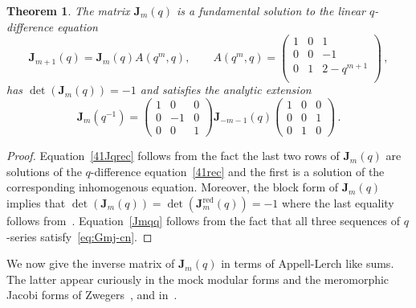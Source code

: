 \documentclass[12pt,reqno]{amsart}
\newtheorem{theorem}{Theorem}
\theoremstyle{definition}
\def\be{\begin{equation}}
\def\ee{\end{equation}}
\def\bJ{\mathbf J}
\def\RED{\mathrm{red}}
\begin{document}
\begin{theorem}
\label{thm.41bJ1}
  The matrix $\bJ_{m}(q)$ is a fundamental solution to the linear $q$-difference
  equation
\be
\label{41Jqrec}
\bJ_{m+1}(q) = \bJ_{m}(q) A(q^m,q), \qquad A(q^m,q)=
\begin{pmatrix}
1 & 0 & 1\\
0 & 0 & -1\\
0 & 1 & 2-q^{m+1}\\
\end{pmatrix} \,,
\ee
has $\det(\bJ_m(q))=-1$ and satisfies the analytic extension
\begin{equation}
\label{Jmqq}  
  \bJ_m(q^{-1}) =
  \begin{pmatrix}
    1&0&0\\
    0&-1&0\\
    0&0&1
  \end{pmatrix} \bJ_{-m-1}(q)
  \begin{pmatrix}
    1&0&0\\
    0&0&1\\
    0&1&0
  \end{pmatrix} \,.
\end{equation}
\end{theorem}


\begin{proof}
Equation~\eqref{41Jqrec} follows from the fact the last two rows of $\bJ_m(q)$ are   
solutions of the $q$-difference equation~\eqref{41rec} and the first is a solution
of the corresponding inhomogenous equation. Moreover, the block form of $\bJ_m(q)$
implies that $\det(\bJ_m(q))=\det(\bJ^\RED_m(q))=-1$ where the last equality follows
from~\cite[eq.~(14)]{GGM:resurgent}. Equation~\eqref{Jmqq} follows from the
fact that all three sequences of $q$-series satisfy~\eqref{eq:Gmj-cn}.
\end{proof}

We now give the inverse matrix of $\bJ_m(q)$ in terms of Appell-Lerch like sums.
The latter appear curiously in the mock modular forms and the meromorphic Jacobi
forms of Zwegers~\cite{Zwegers:thesis}, and in~\cite{DMZ:blackholes}.
\end{document}
